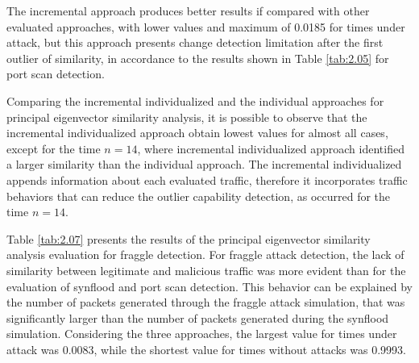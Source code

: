 The incremental approach produces better results if compared with other evaluated approaches, with lower values and maximum of 0.0185 for times under attack, but this approach presents change detection limitation after the first outlier of similarity, in accordance to the results shown in Table \ref{tab:2.05} for port scan detection. 

Comparing the incremental individualized and the individual approaches for principal eigenvector similarity analysis, it is possible to observe that the incremental individualized approach obtain lowest values for almost all cases, except for the time $n=14$, where incremental individualized approach identified a larger similarity than the individual approach. The incremental individualized appends information about each evaluated traffic, therefore it incorporates traffic behaviors that can reduce the outlier capability detection, as occurred for the time $n=14$.

Table \ref{tab:2.07} presents the results of the principal eigenvector similarity analysis evaluation for fraggle detection. For fraggle attack detection, the lack of similarity between legitimate and malicious traffic was more evident than for the evaluation of synflood and port scan detection. This behavior can be explained by the number of packets generated through the fraggle attack simulation, that was significantly larger than the number of packets generated during the synflood simulation. Considering the three approaches, the largest value for times under attack was 0.0083, while the shortest value for times without attacks was 0.9993. 

